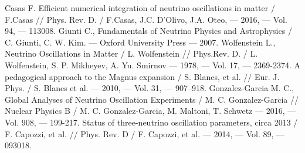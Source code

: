 \documentclass[12pt]{article}
\begin{document}
\newpage
{}
\begin{thebibliography}{99}
 Casas F. Efficient numerical
  integration of neutrino oscillations in matter / F.Casas // Phys. Rev. D. / F.Casas, J.C. D'Olivo, J.A. Oteo, — 2016, —
  Vol. 94, — 113008.
 Giunti C., Fundamentals of Neutrino Physics and Astrophysics / C. 
  Giunti, C. W. Kim. –– Oxford University Press –– 2007.
 Wolfenstein L., Neutrino Oscillations in Matter / L. Wolfenstein // 
 Phys.Rev. D. / L. Wolfenstein, S. P. Mikheyev, A. Yu. Smirnov — 1978, — Vol. 17, — 2369-2374.
 A pedagogical approach to the Magnus expansion / 
 S. Blanes, et al. // Eur. J. Phys. / S. Blanes et al. — 2010, — Vol. 31, — 907–918.
 Gonzalez-Garcia M. C., Global Analyses of Neutrino
 Oscillation Experiments / M. C. Gonzalez-Garcia // Nuclear Physics B / M. C. Gonzalez-Garcia, M. Maltoni, T. Schwetz  — 2016, — Vol. 908, — 199-217.
 Status of three-neutrino oscillation parameters, circa 2013 / F. 
 Capozzi, et al. // Phys. Rev. D / F. Capozzi, et al. — 2014, — Vol. 89, — 093018.
\end{thebibliography}
\end{document}
